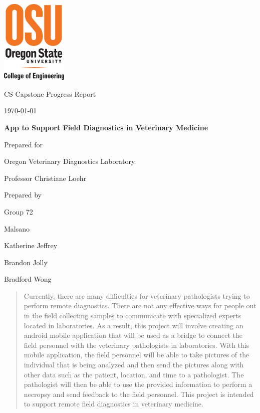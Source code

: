 \documentclass[onecolumn, draftclsnofoot,10pt, compsoc]{IEEEtran}
\def \CapstoneTeamName{		Malsano}
\def \CapstoneTeamNumber{		72}
\def \GroupMemberOne{			Katherine Jeffrey}
\def \GroupMemberTwo{			Brandon Jolly}
\def \GroupMemberThree{			Bradford Wong}
\def \CapstoneProjectName{		App to Support Field Diagnostics in Veterinary Medicine}
\def \CapstoneSponsorCompany{	Oregon Veterinary Diagnostics Laboratory}
\def \CapstoneSponsorPerson{		Professor Christiane Loehr}
\def \DocType{		%
				Progress Report
				}
\newcommand{\NameSigPair}[1]{\par
\makebox[2.75in][r]{#1} \hfil 	\makebox[3.25in]{\makebox[2.25in]{\hrulefill} \hfill		\makebox[.75in]{\hrulefill}}
\par\vspace{-12pt} \textit{\tiny\noindent
\makebox[2.75in]{} \hfil		\makebox[3.25in]{\makebox[2.25in][r]{Signature} \hfill	\makebox[.75in][r]{Date}}}}
\renewcommand{\NameSigPair}[1]{#1}
\begin{document}
\begin{titlepage}
    \begin{singlespace}
    	\includegraphics[height=4cm]{coe_v_spot1}
        \hfill 
        \par\vspace{.2in}
        \centering
        \scshape{
            \huge CS Capstone \DocType \par
            {\large\today}\par
            \vspace{.5in}
            \textbf{\Huge\CapstoneProjectName}\par
            \vfill
            {\large Prepared for}\par
            \Huge \CapstoneSponsorCompany\par
            \vspace{5pt}
            {\Large\NameSigPair{\CapstoneSponsorPerson}\par}
            {\large Prepared by }\par
            Group\CapstoneTeamNumber\par
            \CapstoneTeamName\par 
            \vspace{5pt}
            {\Large
                \NameSigPair{\GroupMemberOne}\par
                \NameSigPair{\GroupMemberTwo}\par
                \NameSigPair{\GroupMemberThree}\par
            }
            \vspace{20pt}
        }
        \begin{abstract}
        	Currently, there are many difficulties for veterinary pathologists trying to perform remote diagnostics. There are not any effective ways for people out in the field collecting samples to communicate with specialized experts located in laboratories. As a result, this project will involve creating an android mobile application that will be used as a bridge to connect the field personnel with the veterinary pathologists in laboratories. With this mobile application, the field personnel will be able to take pictures of the individual that is being analyzed and then send the pictures along with other data such as the patient, location, and time to a pathologist. The pathologist will then be able to use the provided information to perform a necropsy and send feedback to the field personnel. This project is intended to support remote field diagnostics in veterinary medicine.

\end{abstract}
\end{singlespace}
\end{titlepage}
\end{document}
